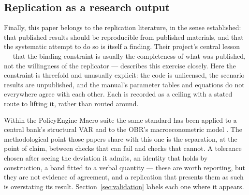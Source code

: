 \subsection{Replication as a research output}

Finally, this paper belongs to the replication literature, in the sense \citet{dewald1986} established: that published results should be reproducible from published materials, and that the systematic attempt to do so is itself a finding. Their project's central lesson --- that the binding constraint is usually the completeness of what was published, not the willingness of the replicator --- describes this exercise closely. Here the constraint is threefold and unusually explicit: the code is unlicensed, the scenario results are unpublished, and the manual's parameter tables and equations do not everywhere agree with each other. Each is recorded as a ceiling with a stated route to lifting it, rather than routed around.

Within the PolicyEngine Macro suite the same standard has been applied to a central bank's structural VAR \citep{ahmadi2026boesvar} and to the OBR's macroeconometric model \citep{ahmadi2026obr}. The methodological point those papers share with this one is the separation, at the point of claim, between checks that can fail and checks that cannot. A tolerance chosen after seeing the deviation it admits, an identity that holds by construction, a band fitted to a verbal quantity --- these are worth reporting, but they are not evidence of agreement, and a replication that presents them as such is overstating its result. Section~\ref{sec:validation} labels each one where it appears.
